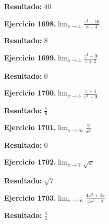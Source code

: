 \documentclass[10pt,a4paper]{article}
\begin{document}
\begin{solbox}
\textbf{Resultado:} \(\displaystyle 40\)
\end{solbox}

\begin{ejbox}
\textbf{Ejercicio 1698.}\quad $\lim_{x\to 4} \frac{x^2-16}{x-4}$
\end{ejbox}

\begin{solbox}
\textbf{Resultado:} \(\displaystyle 8\)
\end{solbox}

\newpage
\begin{ejbox}
\textbf{Ejercicio 1699.}\quad $\lim_{x\to 3} \frac{x^2-9}{x+2}$
\end{ejbox}

\begin{solbox}
\textbf{Resultado:} \(\displaystyle 0\)
\end{solbox}

\begin{ejbox}
\textbf{Ejercicio 1700.}\quad $\lim_{x\to 3} \frac{x-3}{x^2-9}$
\end{ejbox}

\begin{solbox}
\textbf{Resultado:} \(\displaystyle \frac{1}{6}\)
\end{solbox}

\begin{ejbox}
\textbf{Ejercicio 1701.}\quad $\lim_{x\to \infty} \frac{9}{x^2}$
\end{ejbox}

\begin{solbox}
\textbf{Resultado:} \(\displaystyle 0\)
\end{solbox}

\newpage
\begin{ejbox}
\textbf{Ejercicio 1702.}\quad $\lim_{x\to 7} \sqrt{x}$
\end{ejbox}

\begin{solbox}
\textbf{Resultado:} \(\displaystyle \sqrt{7}\)
\end{solbox}

\begin{ejbox}
\textbf{Ejercicio 1703.}\quad $\lim_{x\to \infty} \frac{4x^3 + 3x}{4x^3 - 2}$
\end{ejbox}

\begin{solbox}
\textbf{Resultado:} \(\displaystyle \frac{4}{4}\)
\end{solbox}
\end{document}
